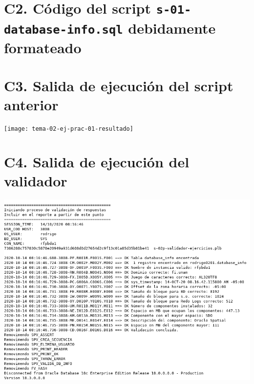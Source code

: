 \documentclass{article}
\begin{document}


\section*{C2. Código del script \texttt{s-01-database-info.sql} debidamente 
formateado}




\section*{C3. Salida de ejecución del script anterior}

\texttt{[image: tema-02-ej-prac-01-resultado]}

\section*{C4. Salida de ejecución del validador}

\includegraphics[width=\linewidth]{tema02-ej-prac-01-validador}
\end{document}
